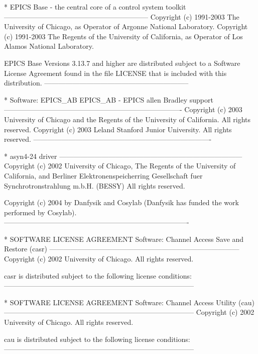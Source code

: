 * EPICS Base - the central core of a control system toolkit
--------------------------------------------------------------
Copyright (c) 1991-2003 The University of Chicago, as Operator
of Argonne National Laboratory.
Copyright (c) 1991-2003 The Regents of the University of
California, as Operator of Los Alamos National Laboratory.

EPICS Base Versions 3.13.7 and higher are distributed
subject to a Software License Agreement found in the
file LICENSE that is included with this distribution.
--------------------------------------------------------------



* Software: EPICS_AB
EPICS_AB - EPICS allen Bradley support
----------------------------------------------------------------------------
Copyright (c) 2003 University of Chicago and the
 Regents of the University of California. All rights reserved.
Copyright (c) 2003 Leland Stanford Junior University. All rights reserved.
----------------------------------------------------------------------------

* asyn4-24 driver
------------------------------------------------------------------------------
Copyright (c) 2002 University of Chicago, The Regents of the
University of California, and Berliner Elektronenspeicherring
Gesellschaft fuer Synchrotronstrahlung m.b.H. (BESSY) All rights
reserved.

Copyright (c) 2004 by Danfysik and Cosylab (Danfysik has funded the work
performed by Cosylab).
-------------------------------------------------------------------------------


 * SOFTWARE LICENSE AGREEMENT
 Software: Channel Access Save and Restore (casr)
--------------------------------------------------------------------------------- 
 Copyright (c) 2002 University of Chicago. All rights reserved.

casr is distributed subject to the following license conditions:
---------------------------------------------------------------------------------


* SOFTWARE LICENSE AGREEMENT
 Software: Channel Access Utility (cau)
---------------------------------------------------------------------------------
Copyright (c) 2002 University of Chicago. All rights reserved.

cau is distributed subject to the following license conditions:
---------------------------------------------------------------------------------
